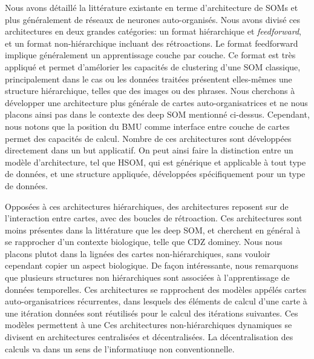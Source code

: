 \documentclass[../main]{subfiles}
\begin{document}
Nous avons détaillé la littérature existante en terme d'architecture de SOMs et plus généralement de réseaux de neurones auto-organisés. Nous avons divisé ces architectures en deux grandes catégories: un format hiérarchique et \emph{feedforward}, et un format non-hiérarchique incluant des rétroactions.
Le format feedforward implique généralement un apprentissage couche par couche. Ce format est très appliqué et permet d'amélorier les capacités de clustering d'une SOM classique, principalement dans le cas ou les données traitées présentent elles-mêmes une structure hiérarchique, telles que des images ou des phrases.
Nous cherchons à développer une architecture plus générale de cartes auto-organisatrices et ne nous placons ainsi pas dans le contexte des deep SOM mentionné ci-dessus. 
Cependant, nous notons que la position du BMU comme interface entre couche de cartes permet des capacités de calcul.
Nombre de ces architectures sont développées directement dans un but applicatif. On peut ainsi faire la distinction entre un modèle d'architecture, tel que HSOM, qui est générique et applicable à tout type de données, et une structure appliquée, développées spécifiquement pour un type de données.

Opposées à ces architectures hiérarchiques, des architectures reposent sur de l'interaction entre cartes, avec des boucles de rétroaction.
Ces architectures sont moins présentes dans la littérature que les deep SOM, et cherchent en général à se rapprocher d'un contexte biologique, telle que CDZ dominey.
Nous nous placons plutot dans la lignées des cartes non-hiérarchiques, sans vouloir cependant copier un aspect biologique.
De façon intéressante, nous remarquons que plusieurs structures non hiérarchiques sont associées à l'apprentissage de données temporelles. Ces architectures se rapprochent des modèles appélés cartes auto-organisatrices récurrentes, dans lesquels des éléments de calcul d'une carte à une itération données sont réutilisés pour le calcul des itérations suivantes. Ces modèles permettent à une 
Ces architectures non-hiérarchiques dynamiques se divisent en architectures centralisées et décentralisées. La décentralisation des calculs va dans un sens de l'informatiuqe non conventionnelle.
\end{document}
